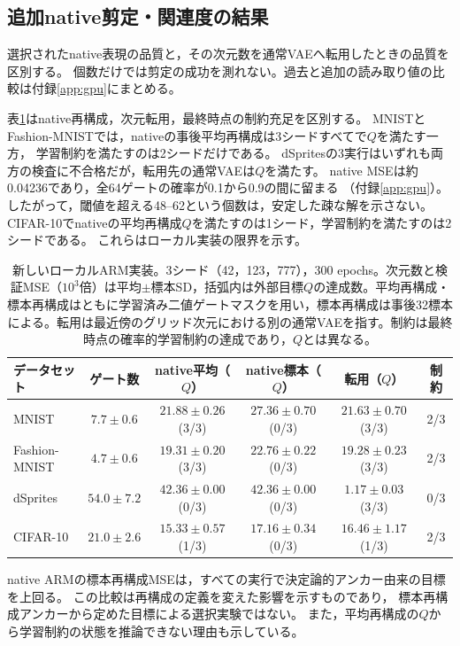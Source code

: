 \documentclass[11pt,a4paper]{ltjsarticle}
\begin{document}
\subsection{追加native剪定・関連度の結果}\label{sec:newpruning}
選択されたnative表現の品質と，その次元数を通常VAEへ転用したときの品質を区別する。
個数だけでは剪定の成功を測れない。過去と追加の読み取り値の比較は付録\ref{app:gpu}にまとめる。

表\ref{tab:armnew}はnative再構成，次元転用，最終時点の制約充足を区別する。
MNISTとFashion-MNISTでは，nativeの事後平均再構成は3シードすべてで$Q$を満たす一方，
学習制約を満たすのは2シードだけである。
dSpritesの3実行はいずれも両方の検査に不合格だが，転用先の通常VAEは$Q$を満たす。
native MSEは約0.04236であり，全64ゲートの確率が0.1から0.9の間に留まる
（付録\ref{app:gpu}）。
したがって，閾値を超える48--62という個数は，安定した疎な解を示さない。
CIFAR-10でnativeの平均再構成$Q$を満たすのは1シード，学習制約を満たすのは2シードである。
これらはローカル実装の限界を示す。
\begin{table}[H]
\caption{新しいローカルARM実装。3シード（42，123，777），300 epochs。次元数と検証MSE（$10^3$倍）は平均$\pm$標本SD，括弧内は外部目標$Q$の達成数。平均再構成・標本再構成はともに学習済み二値ゲートマスクを用い，標本再構成は事後32標本による。転用は最近傍のグリッド次元における別の通常VAEを指す。制約は最終時点の確率的学習制約の達成であり，$Q$とは異なる。}\label{tab:armnew}
\footnotesize
\setlength{\tabcolsep}{3pt}
\begin{tabular*}{\textwidth}{@{\extracolsep{\fill}}lccccc@{}}
\toprule
データセット & ゲート数 & native平均（$Q$） & native標本（$Q$） & 転用（$Q$） & 制約 \\
\midrule
MNIST & $7.7 \pm 0.6$ & $21.88 \pm 0.26$ (3/3) & $27.36 \pm 0.70$ (0/3) & $21.63 \pm 0.70$ (3/3) & 2/3 \\
Fashion-MNIST & $4.7 \pm 0.6$ & $19.31 \pm 0.20$ (3/3) & $22.76 \pm 0.22$ (0/3) & $19.28 \pm 0.23$ (3/3) & 2/3 \\
dSprites & $54.0 \pm 7.2$ & $42.36 \pm 0.00$ (0/3) & $42.36 \pm 0.00$ (0/3) & $1.17 \pm 0.03$ (3/3) & 0/3 \\
CIFAR-10 & $21.0 \pm 2.6$ & $15.33 \pm 0.57$ (1/3) & $17.16 \pm 0.34$ (0/3) & $16.46 \pm 1.17$ (1/3) & 2/3 \\
\bottomrule\end{tabular*}
\end{table}

native ARMの標本再構成MSEは，すべての実行で決定論的アンカー由来の目標を上回る。
この比較は再構成の定義を変えた影響を示すものであり，
標本再構成アンカーから定めた目標による選択実験ではない。
また，平均再構成の$Q$から学習制約の状態を推論できない理由も示している。
\end{document}
